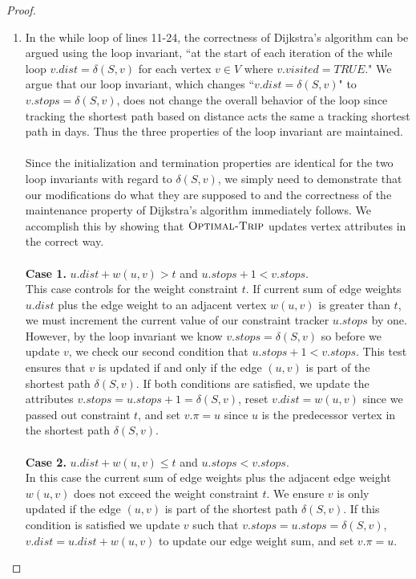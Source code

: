\documentclass[11pt]{article}
\theoremstyle{nonumberplain}
\newtheorem{proof}{Proof}
\begin{document}
\begin{enumerate}
\begin{proof}
\begin{enumerate}
    \item In the while loop of lines 11-24, the correctness of Dijkstra's algorithm can be argued using the loop invariant, ``at the start of each iteration of the while loop $v.dist=\delta(S,v)$ for each vertex $v \in V$ where $v.visited=TRUE$." We argue that our loop invariant, which changes ``$v.dist=\delta(S,v)$" to $v.stops=\delta(S,v)$, does not change the overall behavior of the loop since tracking the shortest path based on distance acts the same a tracking shortest path in days. Thus the three properties of the loop invariant are maintained.\\
    \\
    Since the initialization and termination properties are identical for the two loop invariants with regard to $\delta(S,v)$, we simply need to demonstrate that our modifications do what they are supposed to and the correctness of the maintenance property of Dijkstra's algorithm immediately follows. We accomplish this by showing that $\textnormal{\scshape Optimal-Trip}$ updates vertex attributes in the correct way.\\
    \\
    \textbf{Case 1.} \If $u.dist+w(u,v)>t$ and $u.stops+1<v.stops$.\\
    This case controls for the weight constraint $t$. If current sum of edge weights $u.dist$ plus the edge weight to an adjacent vertex $w(u,v)$ is greater than $t$, we must increment the current value of our constraint tracker $u.stops$ by one. However, by the loop invariant we know $v.stops=\delta(S,v)$ so before we update $v$, we check our second condition that $u.stops+1<v.stops$. This test ensures that $v$ is updated if and only if the edge $(u,v)$ is part of the shortest path $\delta(S,v)$. If both conditions are satisfied, we update the attributes $v.stops=u.stops+1=\delta(S,v)$, reset $v.dist=w(u,v)$ since we passed out constraint $t$, and set $v.\pi=u$ since $u$ is the predecessor vertex in the shortest path $\delta(S,v)$.\\
    \\
    \textbf{Case 2.} \If $u.dist+w(u,v) \le t$ and $u.stops<v.stops$.\\
    In this case the current sum of edge weights plus the adjacent edge weight $w(u,v)$ does not exceed the weight constraint $t$. We ensure $v$ is only updated if the edge $(u,v)$ is part of the shortest path $\delta(S,v)$. If this condition is satisfied we update $v$ such that $v.stops=u.stops=\delta(S,v)$, $v.dist=u.dist+w(u,v)$ to update our edge weight sum, and set $v.\pi=u$.\\

\end{enumerate}
\end{proof}
\end{enumerate}
\end{document}

